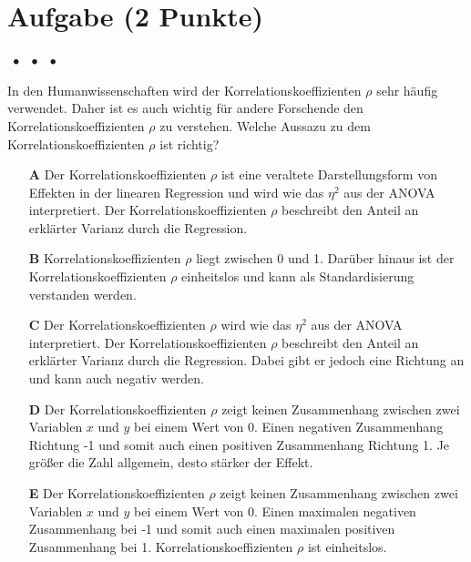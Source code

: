 \documentclass[a4paper, 9pt]{scrartcl}\usepackage[]{graphicx}\usepackage[]{xcolor}
\begin{document}
\section{Aufgabe \hfill (2 Punkte)}

\ifcollection
\begin{flushright}
\tiny\vspace{-2Ex}
\textbf{\examinhaltstart}
\exammodulestat $\;\bullet$
\exammodulestatbbv $\;\bullet$
\exammodulestatversuch $\;\bullet$
\exammodulebiostat
\vspace{-1Ex}
\end{flushright}
\fi




In den Humanwissenschaften wird der Korrelationskoeffizienten $\rho$ sehr häufig verwendet. Daher ist es auch wichtig für andere Forschende den Korrelationskoeffizienten $\rho$ zu verstehen. Welche Aussazu zu dem Korrelationskoeffizienten $\rho$ ist richtig?




\begin{enumerate}
\item [\textbf{A} \msquare] Der Korrelationskoeffizienten $\rho$ ist eine veraltete Darstellungsform von Effekten in der linearen Regression und wird wie das $\eta^2$ aus der ANOVA interpretiert. Der Korrelationskoeffizienten $\rho$ beschreibt den Anteil an erklärter Varianz durch die Regression.
\item [\textbf{B} \msquare] Korrelationskoeffizienten $\rho$ liegt zwischen 0 und 1. Darüber hinaus ist der Korrelationskoeffizienten $\rho$ einheitslos und kann als Standardisierung verstanden werden.
\item [\textbf{C} \msquare] Der Korrelationskoeffizienten $\rho$ wird wie das $\eta^2$ aus der ANOVA interpretiert. Der Korrelationskoeffizienten $\rho$ beschreibt den Anteil an erklärter Varianz durch die Regression. Dabei gibt er jedoch eine Richtung an und kann auch negativ werden.
\item [\textbf{D} \msquare] Der Korrelationskoeffizienten $\rho$ zeigt keinen Zusammenhang zwischen zwei Variablen $x$ und $y$ bei einem Wert von 0. Einen negativen Zusammenhang Richtung -1 und somit auch einen positiven Zusammenhang Richtung 1. Je größer die Zahl allgemein, desto stärker der Effekt.
\item [\textbf{E} \msquare] Der Korrelationskoeffizienten $\rho$ zeigt keinen Zusammenhang zwischen zwei Variablen $x$ und $y$ bei einem Wert von 0. Einen maximalen negativen Zusammenhang bei -1 und somit auch einen maximalen positiven Zusammenhang bei 1. Korrelationskoeffizienten $\rho$ ist einheitslos.
\end{enumerate}
\end{document}
